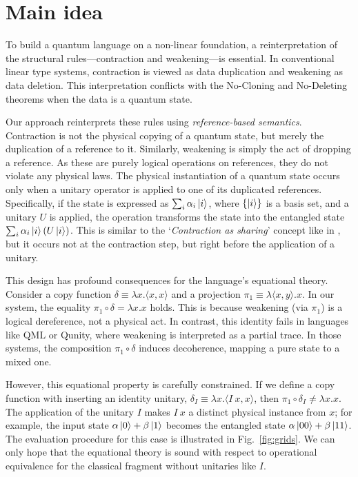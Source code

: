 
\section{Main idea} \label{sec:main-idea}
To build a quantum language on a non-linear foundation, a reinterpretation of the structural rules---contraction and weakening---is essential.
In conventional linear type systems, contraction is viewed as data duplication and weakening as data deletion.
This interpretation conflicts with the No-Cloning and No-Deleting theorems when the data is a quantum state.

Our approach reinterprets these rules using \textit{reference-based semantics}.
Contraction is not the physical copying of a quantum state, but merely the duplication of a reference to it.
Similarly, weakening is simply the act of dropping a reference.
As these are purely logical operations on references, they do not violate any physical laws.
The physical instantiation of a quantum state occurs only when a unitary operator is applied to one of its duplicated references.
Specifically, if the state is expressed as $\sum_i\alpha_i\ket{i}$, where $\{\ket{i}\}$ is a basis set, and a unitary $U$ is applied, the operation transforms the state into the entangled state $\sum_i\alpha_i\ket{i}(U\ket{i})$.
This is similar to the `\textit{Contraction as sharing}' concept like in \cite{ALTENKIRCH2005_FunctionalQuantumProgramming,ARRIGHI2004_OperationalSemanticsFormal}, but it occurs not at the contraction step, but right before the application of a unitary.

This design has profound consequences for the language's equational theory.
Consider a copy function $\delta \equiv \lambda x.\langle x,x\rangle$ and a projection $\pi_1 \equiv \lambda\langle x,y\rangle.x$.
In our system, the equality $\pi_1\circ\delta=\lambda x. x$ holds.
This is because weakening (via $\pi_1$) is a logical dereference, not a physical act.
In contrast, this identity fails in languages like QML\cite{ALTENKIRCH2005_FunctionalQuantumProgramming} or Qunity\cite{VOICHICK2023_QunityUnifiedLanguage}, where weakening is interpreted as a partial trace.
In those systems, the composition $\pi_1\circ\delta$ induces decoherence, mapping a pure state to a mixed one.

However, this equational property is carefully constrained.
If we define a copy function with inserting an identity unitary, $\delta_I \equiv \lambda x.\langle I\ x,x\rangle$, then $\pi_1\circ\delta_I\ne\lambda x.x$.
The application of the unitary $I$ makes $I\ x$ a distinct physical instance from $x$; for example, the input state $\alpha\ket{0}+\beta\ket{1}$ becomes the entangled state $\alpha\ket{00}+\beta\ket{11}$.
The evaluation procedure for this case is illustrated in Fig.~\ref{fig:grids}.
We can only hope that the equational theory is sound with respect to operational equivalence for the classical fragment without unitaries like $I$.

